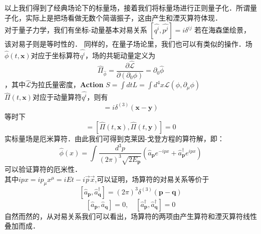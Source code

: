 \begin{corollary}{}
以上我们得到了经典场论下的标量场，接着我们将标量场进行正则量子化．所谓量子化，实际上是把场看做无数个简谐振子，这由产生和湮灭算符体现．\\
对于量子力学，我们有坐标-动量基本对易关系
$\left[\hat{q^{i}}, \hat{p^{j}}\right]=i \delta^{i j}$
若在海森堡绘景，该对易子则是等时性的．
同样的，在量子场论里，我们也可以有类似的操作．场$\hat{\phi}(t, \mathbf{x})$对应于坐标算符$\hat{q^{i}}$，场的共轭动量定义为\begin{equation}
\hat{\Pi}_{\hat{\phi}}=\frac{\partial \hat{\mathcal{L}}}{\partial\left(\partial_{0} \phi\right)}=\partial_{0} \hat{\phi}
\end{equation}，其中$\hat{\mathcal{L}}$为拉氏量密度，\textbf{Action} $S=\int d t L=\int d^{4} x \mathcal{L}\left(\phi, \partial_{\mu} \phi\right)$\\
$\hat{\Pi}(t, \mathbf{x})$对应于动量算符$\hat{q^{i}}$，则有
\begin{equation}
[\hat{\phi}(t, \mathbf{x}), \hat{\Pi}(t, \mathbf{y})]=i \delta^{(3)}(\mathbf{x}-\mathbf{y})
\end{equation}
等时下
\begin{equation}
[\hat{\phi}(t, \mathbf{x}), \hat{\phi}(t, \mathbf{y})]=[\hat{\Pi}(t, \mathbf{x}), \hat{\Pi}(t, \mathbf{y})]=0
\end{equation}
实标量场是厄米算符．由此我们可得到克莱因-戈登方程的算符解，即：
\begin{equation}
\hat{\phi}(x)=\int \frac{d^{3} p}{(2 \pi)^{3} \sqrt{2 E_{\mathbf{p}}}}\left(\hat{a}_{\mathbf{p}} e^{-i p x}+\hat{a}_{\mathbf{p}}^{\dagger} e^{i p x}\right)
\end{equation}
可以验证算符的厄米性．\\
其中$ipx=ip_\mu x^\mu=iEt-i\vec{p}\vec{x}$,可以证明，场算符的对易关系等价于
\begin{equation}
\left[\hat{a}_{\mathbf{p}}, \hat{a}_{\mathbf{q}}^{\dagger}\right]=(2 \pi)^{3} \delta^{(3)}(\mathbf{p}-\mathbf{q})
\end{equation}
\begin{equation}
\left[\hat{a}_{\mathbf{p}}, \hat{a}_{\mathbf{q}}\right]=0, \quad\left[\hat{a}_{\mathbf{p}}^{\dagger}, \hat{a}_{\mathbf{q}}^{\dagger}\right]=0
\end{equation}
自然而然的，从对易关系我们可以看出，场算符的两项由产生算符和湮灭算符线性叠加而成．
\end{corollary}
